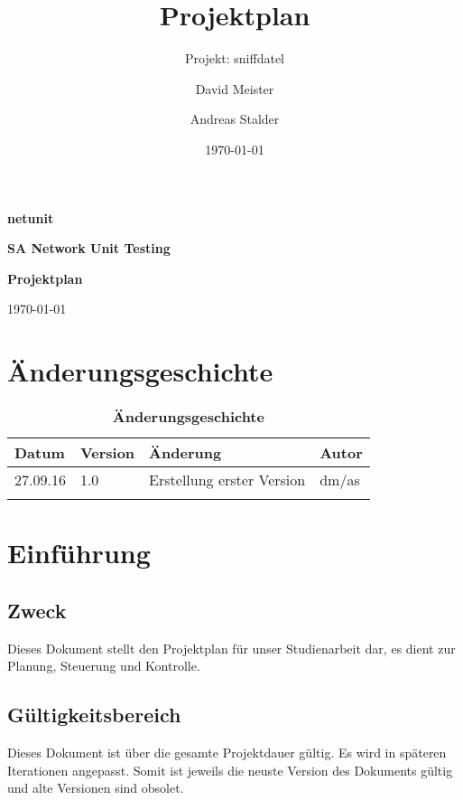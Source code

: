 \documentclass[a4,12pt]{scrartcl}
\title{Projektplan}
\subtitle{Projekt: sniffdatel}
\author{David Meister \and Andreas Stalder}
\date{\today}
\begin{document}
\begin{titlepage}
	\centering
	\vspace{5cm}
	\begin{center}
	\end{center}
	{\huge\bfseries netunit\par}
	\vspace{8cm}
	\raggedright
	{\bfseries SA Network Unit Testing\par}
	{\huge\bfseries Projektplan\par}
	\vspace{1cm}
	{\theauthor \par}
	{\today\par}

\end{titlepage}

\section{Änderungsgeschichte}

\begin{table}[htb]
\centering
    \begin{tabular}{@{} l l l l@{}}\toprule    
    {Datum} & {Version} & {Änderung} & {Autor}\\ \midrule
    27.09.16 & 1.0 & Erstellung erster Version & dm/as\\ \addlinespace
    \end{tabular}
\caption{\textbf{Änderungsgeschichte}}
\end{table}

\newpage

\tableofcontents
\newpage


\section{Einführung}
\subsection{Zweck}
Dieses Dokument stellt den Projektplan für unser Studienarbeit dar, es dient zur Planung, Steuerung und Kontrolle.
\subsection{Gültigkeitsbereich}
Dieses Dokument ist über die gesamte Projektdauer gültig. Es wird in späteren Iterationen angepasst. Somit ist jeweils die neuste Version des Dokuments gültig und alte Versionen sind obsolet.
\end{document}

